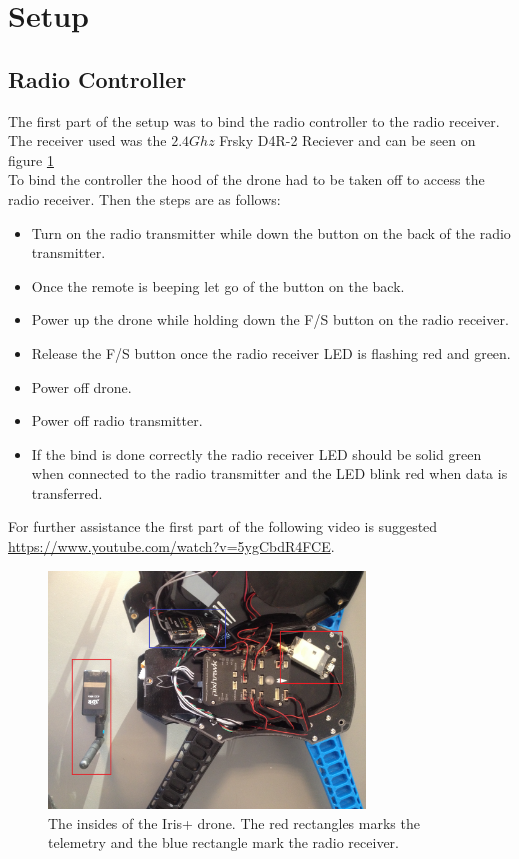 \section{Setup}
\subsection*{Radio Controller}
The first part of the setup was to bind the radio controller to the radio receiver. The receiver used was the $2.4 Ghz$ Frsky D4R-2 Reciever \cite{Ref:FrSky} and can be seen on figure \ref{fig:irisInside}\\ 
To bind the controller the hood of the drone had to be taken off to access the radio receiver. Then the steps are as follows:
\begin{itemize}
\item[1.] Turn on the radio transmitter while down the button on the back of the radio transmitter.
\item[2.] Once the remote is beeping let go of the button on the back.
\item[3.] Power up the drone while holding down the F/S button on the radio receiver.
\item[4.] Release the F/S button once the radio receiver LED is flashing red and green.
\item[5.] Power off drone.
\item[6.] Power off radio transmitter.
\item[7.] If the bind is done correctly the radio receiver LED should be solid green when connected to the radio transmitter and the LED blink red when data is transferred.
\end{itemize}
For further assistance the first part of the following video is suggested \url{https://www.youtube.com/watch?v=5ygCbdR4FCE}.

\begin{figure}[H]
  \centering
    \includegraphics[width=0.75\textwidth]{./Images/insideIRIS}
  \caption{The insides of the Iris+ drone. The red rectangles marks the telemetry and the blue rectangle mark the radio receiver.}
  \label{fig:irisInside}
\end{figure}

